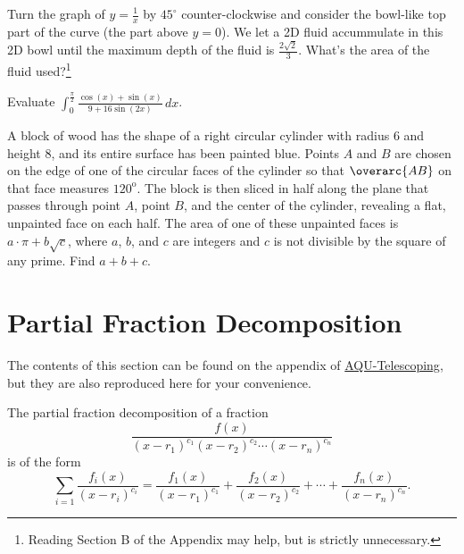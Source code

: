 \documentclass{article}
\begin{document}
\begin{prob}[SMT 2019/7]{9}
Turn the graph of $y=\frac{1}{x}$ by $45^{\circ}$ counter-clockwise and consider the bowl-like top part of the curve (the part above $y=0$). We let a 2D fluid accummulate in this 2D bowl until the maximum depth of the fluid is $\frac{2\sqrt{2}}{3}.$ What’s the area of the fluid used?\footnote{Reading Section B of the Appendix may help, but is strictly unnecessary.}
\end{prob}

\begin{prob}{9}
Evaluate $\int_0^{\frac{\pi}{2}}\frac{\cos(x)+\sin(x)}{9+16\sin(2x)}\,dx$. %
\end{prob}

\begin{prob}[AIME I 2015/15]{13}
A block of wood has the shape of a right circular cylinder with radius $6$ and height $8$, and its entire surface has been painted blue. Points $A$ and $B$ are chosen on the edge of one of the circular faces of the cylinder so that $\overarc{AB}$ on that face measures $120^\text{o}$. The block is then sliced in half along the plane that passes through point $A$, point $B$, and the center of the cylinder, revealing a flat, unpainted face on each half. The area of one of these unpainted faces is $a\cdot\pi + b\sqrt{c}$, where $a$, $b$, and $c$ are integers and $c$ is not divisible by the square of any prime. Find $a+b+c$.

\end{prob}

\pagebreak

\appendix


\section{Partial Fraction Decomposition}

The contents of this section can be found on the appendix of \href{https://www.geometryexplorer.xyz/pdfs/AQU-TelescopingNew.pdf}{AQU-Telescoping}, but they are also reproduced here for your convenience.

\begin{defi}
The partial fraction decomposition of a fraction
\[\frac{f(x)}{(x-r_1)^{c_1}(x-r_2)^{c_2}\cdots (x-r_n)^{c_n}}\]
is of the form
\[\sum_{i=1}\frac{f_i(x)}{(x-r_i)^{c_i}}=\frac{f_1(x)}{(x-r_1)^{c_1}}+\frac{f_2(x)}{(x-r_2)^{c_2}}+\cdots+\frac{f_n(x)}{(x-r_n)^{c_n}}.\]
\end{defi}
\end{document}
